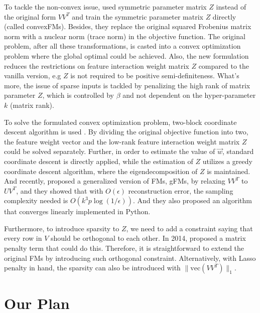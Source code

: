 \documentclass{article}
\newcommand{\vect}{\text{vec}}
\begin{document}
To tackle the non-convex issue, \cite{lu2} used symmetric parameter matrix $Z$ instead of the original form $VV^T$ and train the symmetric parameter matrix $Z$ directly (called convexFMs). Besides, they replace the original squared Frobenius matrix norm with a nuclear norm (trace norm) in the objective function. The original problem, after all these transformations, is casted into a convex optimization problem where the global optimal could be achieved. Also, the new formulation reduces the restrictions on feature interaction weight matrix $Z$ compared to the vanilla version, e.g $Z$ is not required to be  positive semi-definiteness. What’s more, the issue of sparse inputs is tackled by penalizing the high rank of matrix parameter $Z$, which is controlled by $\beta$ and not dependent on the hyper-parameter $k$ (matrix rank).

To solve the formulated convex optimization problem, two-block coordinate descent algorithm is used \cite{lu2}. By dividing the original objective function into two, the feature weight vector and the low-rank feature interaction weight matrix $Z$ could be solved separately. Further, in order to estimate the value of $\vec{w}$, standard coordinate descent is directly applied, while the estimation of $Z$ utilizes a greedy coordinate descent algorithm, where the eigendecomposition of $Z$ is maintained. And recently, \cite{lin2016non} proposed a generalized version of FMs, gFMs, by relaxing $VV^T$ to $UV^T$, and they showed that with $O(\epsilon)$ reconstruction error, the sampling complexity needed is $O(k^3p\log(1 / \epsilon))$. And they also proposed an algorithm that converges linearly implemented in Python. 

Furthermore, to introduce sparsity to $Z$, we need to add a constraint saying that every row in $V$ should be orthogonal to each other. In 2014, \cite{vervier2014learning} proposed a matrix penalty term that could do this. Therefore, it is straightforward to extend the original FMs by introducing such orthogonal constraint. Alternatively, with Lasso penalty in hand, the sparsity can also be introduced with $\|\vect(VV^T)\|_1$. 
 
\section{Our Plan}
\end{document}
